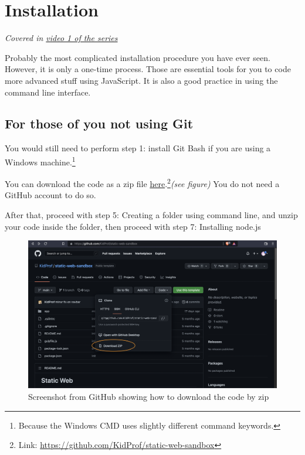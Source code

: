 \chapter{Installation}

\textit{Covered in \href{https://www.youtube.com/watch?v=oIsH0V3fRt8&list=PLjGmdnqrOKuYXiu7lgG5HW71jPEUd1XCm&index=2}{video 1 of the series}}
\vspace{6mm}

Probably the most complicated installation procedure you have ever seen. However, it is only a one-time process. Those are essential tools for you to code more advanced stuff using JavaScript. It is also a good practice in using the command line interface.

\section*{For those of you not using Git}

You would still need to perform step 1: install Git Bash if you are using a Windows machine.\footnote{Because the Windows CMD uses slightly different command keywords.}

You can download the code as a zip file \href{https://github.com/KidProf/static-web-sandbox}{here}.\footnote{Link: \href{https://github.com/KidProf/static-web-sandbox}{https://github.com/KidProf/static-web-sandbox}}\textit{(see figure)} You do not need a GitHub account to do so. 

After that, proceed with step 5: Creating a folder using command line, and unzip your code inside the folder, then proceed with step 7: Installing node.js

\begin{figure}[h]
\centering
\includegraphics[width=15cm]{images/ch1-download-as-zip.png}
\caption{Screenshot from GitHub showing how to download the code by zip}
\end{figure}


